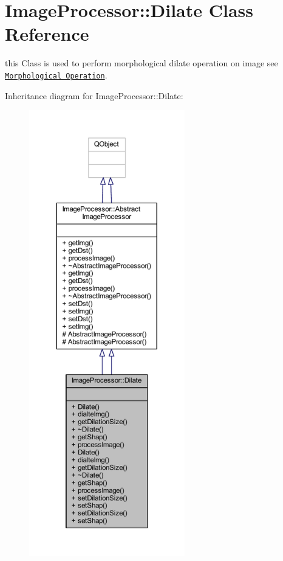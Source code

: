 \hypertarget{class_image_processor_1_1_dilate}{}\section{Image\+Processor\+:\+:Dilate Class Reference}
\label{class_image_processor_1_1_dilate}


this Class is used to perform morphological dilate operation on image see \href{https://docs.opencv.org/trunk/d9/d61/tutorial_py_morphological_ops.html}{\tt Morphological Operation}.  




Inheritance diagram for Image\+Processor\+:\+:Dilate\+:\nopagebreak
\begin{figure}[H]
\begin{center}
\leavevmode
\includegraphics[height=550pt]{dd/d84/class_image_processor_1_1_dilate__inherit__graph}
\end{center}
\end{figure}


